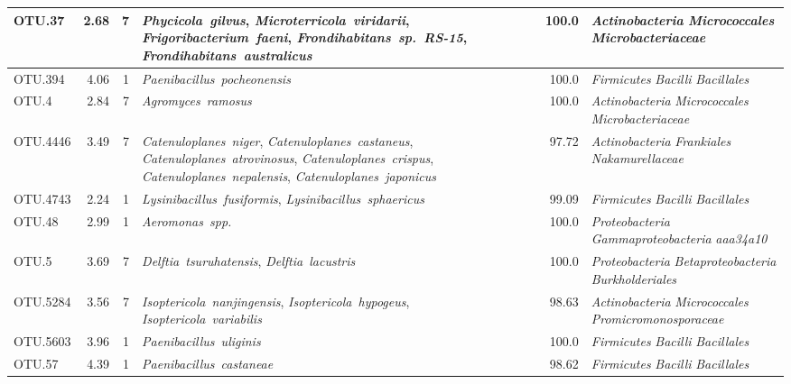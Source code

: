 \begin{ThreePartTable}
\begin{longtable}{lrrP{5cm}rP{5cm}}
OTU.37 & 2.68 & 7 & \mbox{\textit{Phycicola gilvus}}, \mbox{\textit{Microterricola viridarii}}, \mbox{\textit{Frigoribacterium faeni}}, \mbox{\textit{Frondihabitans sp. RS-15}}, \mbox{\textit{Frondihabitans australicus}} & 100.0 & \mbox{\textit{Actinobacteria}} \mbox{\textit{Micrococcales}} \mbox{\textit{Microbacteriaceae}} \\ \midrule
OTU.394 & 4.06 & 1 & \mbox{\textit{Paenibacillus pocheonensis}} & 100.0 & \mbox{\textit{Firmicutes}} \mbox{\textit{Bacilli}} \mbox{\textit{Bacillales}} \\ \midrule
OTU.4 & 2.84 & 7 & \mbox{\textit{Agromyces ramosus}} & 100.0 & \mbox{\textit{Actinobacteria}} \mbox{\textit{Micrococcales}} \mbox{\textit{Microbacteriaceae}} \\ \midrule
OTU.4446 & 3.49 & 7 & \mbox{\textit{Catenuloplanes niger}}, \mbox{\textit{Catenuloplanes castaneus}}, \mbox{\textit{Catenuloplanes atrovinosus}}, \mbox{\textit{Catenuloplanes crispus}}, \mbox{\textit{Catenuloplanes nepalensis}}, \mbox{\textit{Catenuloplanes japonicus}} & 97.72 & \mbox{\textit{Actinobacteria}} \mbox{\textit{Frankiales}} \mbox{\textit{Nakamurellaceae}} \\ \midrule
OTU.4743 & 2.24 & 1 & \mbox{\textit{Lysinibacillus fusiformis}}, \mbox{\textit{Lysinibacillus sphaericus}} & 99.09 & \mbox{\textit{Firmicutes}} \mbox{\textit{Bacilli}} \mbox{\textit{Bacillales}} \\ \midrule
OTU.48 & 2.99 & 1 & \mbox{\textit{Aeromonas spp.}} & 100.0 & \mbox{\textit{Proteobacteria}} \mbox{\textit{Gammaproteobacteria}} \mbox{\textit{aaa34a10}} \\ \midrule
OTU.5 & 3.69 & 7 & \mbox{\textit{Delftia tsuruhatensis}}, \mbox{\textit{Delftia lacustris}} & 100.0 & \mbox{\textit{Proteobacteria}} \mbox{\textit{Betaproteobacteria}} \mbox{\textit{Burkholderiales}} \\ \midrule
OTU.5284 & 3.56 & 7 & \mbox{\textit{Isoptericola nanjingensis}}, \mbox{\textit{Isoptericola hypogeus}}, \mbox{\textit{Isoptericola variabilis}} & 98.63 & \mbox{\textit{Actinobacteria}} \mbox{\textit{Micrococcales}} \mbox{\textit{Promicromonosporaceae}} \\ \midrule
OTU.5603 & 3.96 & 1 & \mbox{\textit{Paenibacillus uliginis}} & 100.0 & \mbox{\textit{Firmicutes}} \mbox{\textit{Bacilli}} \mbox{\textit{Bacillales}} \\ \midrule
OTU.57 & 4.39 & 1 & \mbox{\textit{Paenibacillus castaneae}} & 98.62 & \mbox{\textit{Firmicutes}} \mbox{\textit{Bacilli}} \mbox{\textit{Bacillales}} \\ \midrule

\end{longtable}
\end{ThreePartTable}
